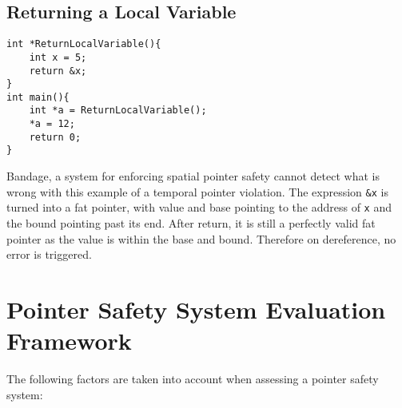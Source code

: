 


\subsection{Returning a Local Variable}

\begin{verbatim}
int *ReturnLocalVariable(){
    int x = 5;
    return &x;
}
int main(){
    int *a = ReturnLocalVariable();
    *a = 12;
    return 0;
}
\end{verbatim}

Bandage, a system for enforcing spatial pointer safety cannot detect what is wrong with this example of a temporal pointer violation.
The expression \verb!&x! is turned into a fat pointer, with value and base pointing to the address of \verb!x! and the bound pointing past its end.
After return, it is still a perfectly valid fat pointer as the value is within the base and bound.
Therefore on dereference, no error is triggered.
\section{Pointer Safety System Evaluation Framework}

The following factors are taken into account when assessing a pointer safety system:

